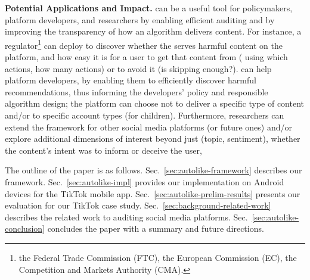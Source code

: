{\bf Potential Applications and Impact.}
\autolike{} can be a useful tool for policymakers,  platform developers, and researchers by enabling efficient auditing and by improving the transparency of how an algorithm delivers content.  For instance, a regulator\footnote{\eg{} the Federal Trade Commission (FTC), the European Commission (EC), the Competition and Markets Authority (CMA).} can deploy \autolike{} to discover whether the \rs{} serves harmful content on the platform, and how easy it is for a user to get that content from \rs{} (\eg{} using which actions, how many actions) or to avoid it (\eg is skipping enough?).  \autolike{} can help platform developers, by enabling them to efficiently discover harmful recommendations, thus informing the developers' policy and responsible algorithm design; \eg the platform can choose not to deliver a specific type of content and/or to specific account types (\eg for children).
 Furthermore, researchers can extend the framework for other social media platforms (or future ones) and/or explore additional dimensions of interest beyond just (topic, sentiment), \eg{} whether the content's intent was to inform or deceive the user, \etc 





The outline of the paper is as follows. 
Sec.~\ref{sec:autolike-framework} describes our \autolike{} framework. Sec.~\ref{sec:autolike-impl} provides our implementation on Android devices for the TikTok mobile app.
Sec.~\ref{sec:autolike-prelim-results} presents our evaluation for our TikTok case study.
Sec.~\ref{sec:background-related-work} describes the related work to auditing social media platforms. Sec.~\ref{sec:autolike-conclusion} concludes the paper with a summary and future directions.


